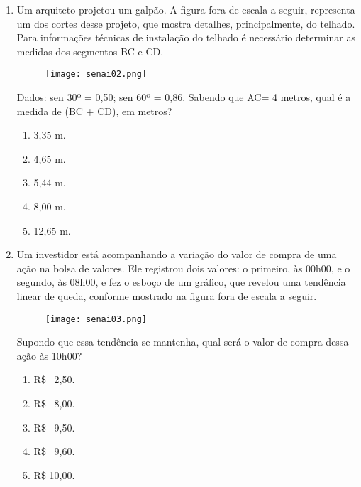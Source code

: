 \documentclass[a4paper,14pt]{article}
\begin{document}
\begin{enumerate}
    	\item Um arquiteto projetou um galpão. A figura fora de escala a seguir, representa um dos cortes desse
    	projeto, que mostra detalhes, principalmente, do telhado. Para informações técnicas de instalação do
    	telhado é necessário determinar as medidas dos segmentos BC e CD. 
    	\begin{figure}[h] %
    		\centering
    		\texttt{[image: senai02.png]} %
    	\end{figure}
    	\newline
    	Dados: sen 30º = 0,50; sen 60º = 0,86.
    	\newline
    	\newline
    	Sabendo que AC= 4 metros, qual é a medida de (BC + CD), em metros?
    	\begin{enumerate}
    		\item 3,35 m.
    		\item 4,65 m.
    		\item 5,44 m.
    		\item 8,00 m.
    		\item 12,65 m.
    	\end{enumerate}
    	\vspace{0cm}
    	
    	\item Um investidor está acompanhando a variação do valor de compra de uma ação na bolsa de valores. Ele
    	registrou dois valores: o primeiro, às 00h00, e o segundo, às 08h00, e fez o esboço de um gráfico, que
    	revelou uma tendência linear de queda, conforme mostrado na figura fora de escala a seguir.
    	\newline
   		\begin{figure}[h] %
    		\centering
    		\texttt{[image: senai03.png]} %
    	\end{figure}
    	\newline
    	\newline
    	\newline
    	\newline
    	\newline
    	\newline
    	Supondo que essa tendência se mantenha, qual será o valor de compra dessa ação às 10h00?
    	\begin{enumerate}
    		\item R\$ ~2,50.
    		\item R\$ ~8,00.
    		\item R\$ ~9,50.
    		\item R\$ ~9,60.
    		\item R\$ 10,00.
    	\end{enumerate}
    	\vspace{0cm}
    	

\end{enumerate}
\end{document}
